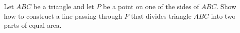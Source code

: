 \documentclass[varwidth]{standalone}
\begin{document}
    Let $ABC$ be a triangle and let $P$ be a point on one of the sides of $ABC$. Show how to construct a line passing through $P$ that divides triangle $ABC$ into two parts of equal area.
\end{document}

